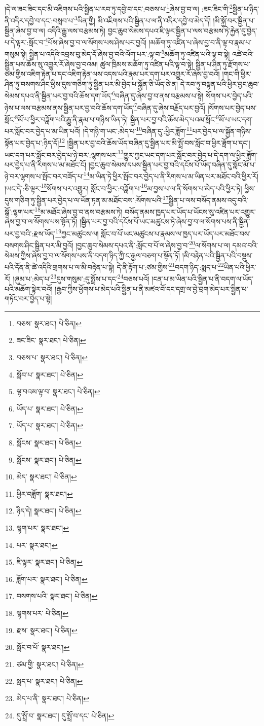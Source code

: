 །དེ་ལ་ཟང་ཟིང་དང་མི་འཇིགས་པའི་སྦྱིན་པ་རབ་ཏུ་དབྱེ་བ་དང་:བཅས་པ་\footnote{བཅས་  སྣར་ཐང་།  པེ་ཅིན། }ཞེས་བྱ་བ་ལ། :ཟང་ཟིང་གི་\footnote{ཟང་ཟིང་  སྣར་ཐང་།  པེ་ཅིན། }སྦྱིན་པ་ཉིད་ནི་འདིར་དབྱེ་བ་དང་:བསླབ་པ་\footnote{བཅས་པ་  སྣར་ཐང་།  པེ་ཅིན། }ཡིན་གྱི། མི་འཇིགས་པའི་སྦྱིན་པ་ལ་ནི་འདིར་དབྱེ་བ་མེད་དོ། །མི་སྐྱོ་བར་སྦྱིན་པ་སྦྱིན་ཞེས་བྱ་བ་ལ། འདིའི་རྒྱུ་ལས་བརྩམས་ཏེ། བྱང་ཆུབ་སེམས་དཔའ་ཇི་ལྟར་སྦྱིན་པ་ལས་བརྩམས་ཏེ་རྐྱེན་དུ་བྱེད་པ་དེ་ལྟར་:སློང་བ་\footnote{སློབ་པ་  སྣར་ཐང་།  པེ་ཅིན། }པོས་ཞེས་བྱ་བ་ལ་སོགས་པས་ཤེས་པར་བྱའོ། །མཆོག་ཏུ་འཛིན་པ་ཞེས་བྱ་བ་ནི་ལྟ་བ་རྣམ་པ་གསུམ་སྟེ། སྦྱིན་པ་འདིའི་འབྲས་བུ་མེད་དོ་ཞེས་བྱ་བའི་ལོག་པར་:ལྟ་བ་\footnote{ལྟ་བའམ་ལྟ་བ་  སྣར་ཐང་།  པེ་ཅིན། }མཆོག་ཏུ་འཛིན་པའི་ལྟ་བ་སྟེ། འཚེ་བའི་སྦྱིན་པས་ཆོས་སུ་འགྱུར་རོ་ཞེས་བྱ་བའམ། ཚུལ་ཁྲིམས་མཆོག་ཏུ་འཛིན་པའི་ལྟ་བ་སྟེ། སྦྱིན་པ་ཤིན་ཏུ་རྫོགས་པ་ཙམ་གྱིས་འཇིག་རྟེན་པ་དང་འཇིག་རྟེན་ལས་འདས་པའི་རྣམ་པར་དག་པར་འགྱུར་རོ་ཞེས་བྱ་བའོ། །གང་གི་ཕྱིར་ཤིན་ཏུ་བསགས་ཤིང་ཕྱིས་དུས་གཅིག་ཏུ་སྦྱིན་པར་མི་བྱེད་པ་སྐྱོན་ཅི་ཡོད་ཅེ་ན། དེ་རབ་ཏུ་བསྟན་པའི་ཕྱིར་བྱང་ཆུབ་སེམས་དཔའ་ནི་སྦྱིན་པར་བྱ་བའི་ཆོས་དག་ཡོད་\footnote{ཡོད་པ་  སྣར་ཐང་།  པེ་ཅིན། }བཞིན་དུ་ཞེས་བྱ་བ་ནས་བརྩམས་པ་སྟེ། སོགས་པར་བྱེད་པའི་ཉེས་པ་ལས་བརྩམས་ནས་སྦྱིན་པར་བྱ་བའི་ཆོས་དག་ཡོད་\footnote{ཡོད་པ་  སྣར་ཐང་།  པེ་ཅིན། }བཞིན་དུ་ཞེས་བརྗོད་པར་བྱའོ། །སོགས་པར་བྱེད་པས་སློང་\footnote{སློངས་  སྣར་ཐང་།  པེ་ཅིན། }མོ་པ་ཕྱིར་བཟློག་པའི་རྒྱུ་ནི་རྣམ་པ་གཉིས་ཡིན་ཏེ། སྦྱིན་པར་བྱ་བའི་ཆོས་མེད་པའམ་སློང་\footnote{སློངས་  སྣར་ཐང་།  པེ་ཅིན། }མོ་པ་ཡང་དག་པར་སློང་བར་བྱེད་པ་མ་ཡིན་པའོ། །དེ་གཉི་ག་ཡང་:མེད་པ་\footnote{མེད་  སྣར་ཐང་།  པེ་ཅིན། }བཞིན་དུ་:ཕྱིར་ཟློག་\footnote{ཕྱིར་བཟློག་  སྣར་ཐང་། }པར་བྱེད་པ་ལ་སྐྱོན་གཉིས་སྟོན་པར་བྱེད་པ་:ཉིད་དོ།\footnote{ཉིད་དེ།  སྣར་ཐང་།  པེ་ཅིན། } །སྦྱིན་པར་བྱ་བའི་ཆོས་ཡོད་བཞིན་དུ་སྦྱིན་པར་མི་སྤྲོ་བས་སློང་བ་ཕྱིར་ཟློག་པ་དང་། ཡང་དག་པར་སློང་བར་བྱེད་པ་ཉེ་བར་:ལྷགས་པར་\footnote{ལྷག་པར་  སྣར་ཐང་། }གྱུར་ཀྱང་ཡང་དག་པར་སློང་བར་བྱེད་པ་དེ་དག་ལ་ཕྱིར་ཟློག་པར་བྱེད་པ་ནི་རིགས་པ་མ་མཐོང་ངོ། །བྱང་ཆུབ་སེམས་དཔས་སྦྱིན་པར་བྱ་བའི་དངོས་པོ་ཡོད་བཞིན་དུ་སློང་མོ་པ་ཉེ་བར་ལྷགས་པ་སྤོང་བར་བཟོད་པ་\footnote{པར་  སྣར་ཐང་། }མ་ཡིན་ཏེ་ཕྱིར་སྤོང་བར་བྱེད་པ་ནི་རིགས་པ་མ་ཡིན་པར་མཐོང་བའི་ཕྱིར་རོ། །ཡང་དེ་:ཅི་ལྟར་\footnote{ཇི་ལྟར་  སྣར་ཐང་།  པེ་ཅིན། }སོགས་པར་འགྱུར། སློང་བ་ཕྱིར་:བཟློག་པ་\footnote{ཟློག་པར་  སྣར་ཐང་།  པེ་ཅིན། }མ་བྱས་པ་ལ་ནི་སོགས་པ་མེད་པའི་ཕྱིར་ཏེ། ཕྱིས་དུས་གཅིག་ཏུ་སྦྱིན་པར་བྱེད་པ་ལ་ཡོན་ཏན་མ་མཐོང་བས་:སོགས་པའི་\footnote{བསགས་པའི་  སྣར་ཐང་།  པེ་ཅིན། }སྦྱིན་པ་ལས་བསོད་ནམས་འདུ་བའི་སྒོ་:ལྷག་པར་\footnote{ལྷགས་པར་  པེ་ཅིན། }མ་མཐོང་ཞེས་བྱ་བ་ནས་བརྩམས་ཏེ། བསོད་ནམས་ཁྱད་པར་ཡོད་པ་ཡོངས་སུ་འཛིན་པར་འགྱུར་ཞེས་བྱ་བ་ལ་སོགས་པས་སྟོན་ཏོ། །སྦྱིན་པར་བྱ་བའི་དངོས་པོ་ཡང་མཚུངས་ཏེ་ཞེས་བྱ་བ་ལ་སོགས་པས་ནི་སྦྱིན་པར་བྱ་བའི་:རྫས་ཡོད་\footnote{རྫས་  སྣར་ཐང་།  པེ་ཅིན། }ཀྱང་མཚུངས་ལ། སློང་བ་པོ་ཡང་མཚུངས་པ་རྣམས་ལ་ཁྱད་པར་ཡོད་པར་མཐོང་བས་བསགས་ཤིང་སྦྱིན་པར་མི་བྱའོ། །བྱང་ཆུབ་སེམས་དཔའ་ནི་:སློང་བ་པོ་ལ་ཞེས་བྱ་བ་\footnote{སློང་བ་པོ་  སྣར་ཐང་། }ལ་སོགས་པ་ལ། དམའ་བའི་སེམས་ཀྱིས་ཞེས་བྱ་བ་ལ་སོགས་པས་ནི་བདག་ཉིད་ཀྱི་ང་རྒྱལ་བཅག་པ་སྟོན་ཏོ། །མི་བརྟེན་པའི་སྦྱིན་པའི་བསྡུས་པའི་དོན་ནི་ཚེ་འདིའི་གྲགས་པ་ལ་མི་བརྟེན་པ་སྟེ། དེ་ནི་རྟོག་པ་:ཙམ་གྱིས་\footnote{ཙམ་གྱི་  སྣར་ཐང་།  པེ་ཅིན། }བདག་ཉིད་:སྨད་པ་\footnote{སླད་པ་  སྣར་ཐང་།  པེ་ཅིན། }ཡིན་པའི་ཕྱིར་རོ། །ཞུམ་པ་:མེད་པ་\footnote{མེད་པ་ནི་  སྣར་ཐང་།  པེ་ཅིན། }དུས་གསུམ་:དུ་སྤྲོས་པ་དང་\footnote{དུ་སྤྲོ་བ་  སྣར་ཐང་། དུ་སྤྲོ་བ་དང་  པེ་ཅིན། }བཅས་པའོ། །ངན་པ་མ་ཡིན་པའི་སྦྱིན་པ་ནི་བདག་ལ་ཡོད་པའི་མཆོག་སྟེར་བའོ། །རྒྱབ་ཀྱིས་ཕྱོགས་པ་མེད་པའི་སྦྱིན་པ་ནི་མཛའ་བོ་དང་དགྲ་ལ་བྱེ་བྲག་མེད་པར་སྦྱིན་པ་གཏོང་བར་བྱེད་པ་སྟེ། 